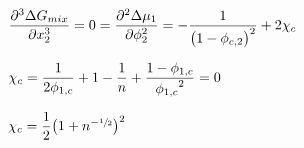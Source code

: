 \begin{bigmdframed}
\begin{listone}
\begin{listtwo}
    	\item $\dfrac{\partial^3\iipf\gibbs_{mix}}{\partial\specfrac{2}^3} = 0 = \dfrac{\partial^2\iipf\chempot_{1}}{\partial\fhmolefrac{2}^2} = -\dfrac{1}{\big(1-\fhmolefrac{\crit,2}\big)^2}+2\fhparam_{\crit}$ \\
    
    	\item $\fhparam_{\crit} = \dfrac{1}{2\fhmolefrac{1,\crit}}+1-\dfrac{1}{n}+\dfrac{1-\fhmolefrac{1,\crit}}{{\fhmolefrac{1,\crit}}^2} = 0$ \\
    
    	\item $\fhparam_{\crit} = \dfrac{1}{2}\big(1+n^{-\sfrac{1}{2}}\big)^2$
    
    \end{listtwo}
    
\end{listone}
    
\end{bigmdframed}